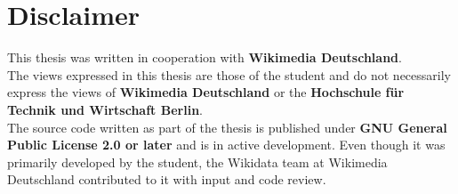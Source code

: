 \chapter{Disclaimer}

This thesis was written in cooperation with \textbf{Wikimedia Deutschland}. \\
The views expressed in this thesis are those of the student and do not necessarily express the views of \textbf{Wikimedia Deutschland} or the \textbf{Hochschule für Technik und Wirtschaft Berlin}. \\
The source code written as part of the thesis is published under \textbf{GNU General Public License 2.0 or later} and is in active development. Even though it was primarily developed by the student, the Wikidata team at Wikimedia Deutschland contributed to it with input and code review.

